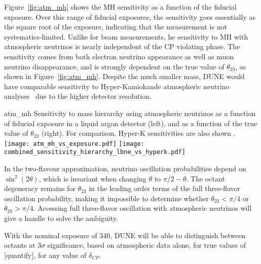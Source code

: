 Figure~\ref{fig:atm_mh} shows the MH sensitivity as a function of the fiducial exposure. 
Over this range of fiducial exposures, the sensitivity goes essentially as the square 
root of the exposure, indicating that the measurement is not systematics-limited. 
Unlike for beam measurements, he sensitivity to MH with atmospheric neutrinos is 
nearly independent of the CP violating phase.  The sensitivity comes from both 
electron neutrino appearance as well as muon neutrino disappearance, and is strongly 
dependent on the true value of $\theta_{23}$, as shown in Figure~\ref{fig:atm_mh}.  Despite the
much smaller mass, DUNE would have comparable sensitivity to Hyper-Kamiokande atmospheric 
neutrino analyses~\cite{Kearns:2013lea} due to the higher detector resolution.    

\begin{cdrfigure}{atm_mh}
{Sensitivity to mass hierarchy using atmospheric neutrinos as a function of fiducial 
exposure in a liquid argon detector (left), and as a function of the true value of 
$\theta_{23}$ (right).  For comparison, Hyper-K sensitivities are also shown \cite{Kearns:2013lea}.}  
\texttt{[image: atm\_mh\_vs\_exposure.pdf]}
\texttt{[image: combined\_sensitivity\_hierarchy\_lbne\_vs\_hyperk.pdf]}
\end{cdrfigure}

In the two-flavour approximation, neutrino oscillation probabilities depend on 
$\sin^2(2\theta)$, which is invariant when changing $\theta$ to $\pi/2-\theta$. The octant 
degeneracy remains for $\theta_{23}$ in the leading order terms of the full 
three-flavor oscillation probability, making it impossible to determine whether $\theta_{23}< \pi/4$ or 
$\theta_{23}> \pi/4$. Accessing full three-flavor oscillation with atmospheric neutrinos 
will give a handle to solve the ambiguity.

With the nominal exposure of \SI{340}{\ktyr}, DUNE will be able to distinguish between 
octants at 3$\sigma$ significance, based on atmospheric data alone, for true values of [quantify], 
for any value of $\delta_{CP}$.


